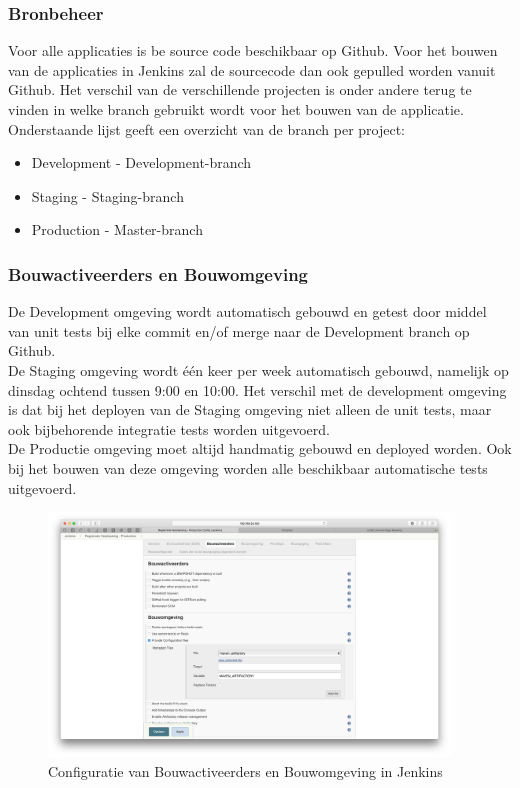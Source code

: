 \subsubsection{Bronbeheer}
Voor alle applicaties is be source code beschikbaar op Github. Voor het bouwen van de applicaties in Jenkins zal de sourcecode dan ook gepulled worden vanuit Github. Het verschil van de verschillende projecten is onder andere terug te vinden in welke branch gebruikt wordt voor het bouwen van de applicatie. Onderstaande lijst geeft een overzicht van de branch per project:

\begin{itemize}
	\setlength\itemsep{0em}
	\item Development - Development-branch
	\item Staging - Staging-branch
	\item Production - Master-branch
\end{itemize}

\subsubsection{Bouwactiveerders en Bouwomgeving}
De Development omgeving wordt automatisch gebouwd en getest door middel van unit tests bij elke commit en/of merge naar de Development branch op Github. 
\\
De Staging omgeving wordt één keer per week automatisch gebouwd, namelijk op dinsdag ochtend tussen 9:00 en 10:00. Het verschil met de development omgeving is dat bij het deployen van de Staging omgeving niet alleen de unit tests, maar ook bijbehorende integratie tests worden uitgevoerd.
\\ 
De Productie omgeving moet altijd handmatig gebouwd en deployed worden. Ook bij het bouwen van deze omgeving worden alle beschikbaar automatische tests uitgevoerd.

\begin{figure}[H]
	\centering
	\includegraphics[width=0.95\textwidth]{img/JenkinsBouwactiveerdersBouwomgeving.png}
	\caption{Configuratie van Bouwactiveerders en Bouwomgeving in Jenkins}
	\label{fig:JenkinsBouwactiveerdersBouwomgeving}
\end{figure}

